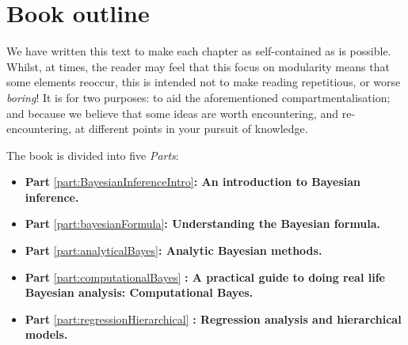 \documentclass[11pt,fullpage]{book}
\begin{document}
\section{Book outline}
We have written this text to make each chapter as self-contained as is possible. Whilst, at times, the reader may feel that this focus on modularity means that some elements reoccur, this is intended not to make reading repetitious, or worse \textit{boring}! It is for two purposes: to aid the aforementioned compartmentalisation; and because we believe that some ideas are worth encountering, and re-encountering, at different points in your pursuit of knowledge.

The book is divided into five \textit{Parts}:

\begin{itemize}
\item \textbf{Part} \ref{part:BayesianInferenceIntro}\textbf{: An introduction to Bayesian inference.} 
\item \textbf{Part} \ref{part:bayesianFormula}\textbf{: Understanding the Bayesian formula.}
\item \textbf{Part} \ref{part:analyticalBayes}\textbf{: Analytic Bayesian methods.}
\item \textbf{Part} \ref{part:computationalBayes} \textbf{: A practical guide to doing real life Bayesian analysis: Computational Bayes.}
\item \textbf{Part} \ref{part:regressionHierarchical} \textbf{: Regression analysis and hierarchical models.}
\end{itemize}
\end{document}
